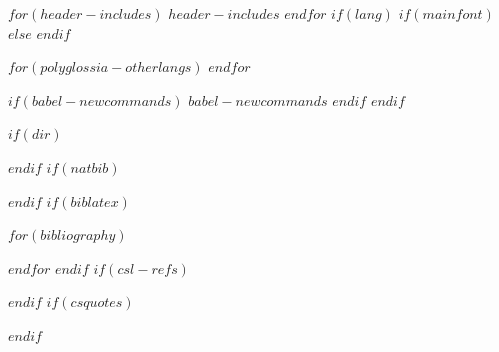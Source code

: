 $for(header-includes)$
$header-includes$
$endfor$
$if(lang)$
\ifxetex
  $if(mainfont)$
  $else$
  \renewcommand*\familydefault{\sfdefault}
  $endif$
  \usepackage{polyglossia}
  \setmainlanguage[$for(polyglossia-lang.options)$$polyglossia-lang.options$$sep$,$endfor$]{$polyglossia-lang.name$}
$for(polyglossia-otherlangs)$
$endfor$
\else
  \usepackage[$for(babel-otherlangs)$$babel-otherlangs$,$endfor$main=$babel-lang$]{babel}
\let\LanguageShortHands\languageshorthands
\def\languageshorthands#1{}
$if(babel-newcommands)$
  $babel-newcommands$
$endif$
\fi
$endif$
\ifluatex
  \usepackage{selnolig}  %
\fi
$if(dir)$
\ifxetex
  \usepackage{bidi}
\fi
{}\fi{} %
  \newcommand{\RL}[1]{\beginR #1\endR}
  \newcommand{\LR}[1]{\beginL #1\endL}
  \newenvironment{RTL}{\beginR}{\endR}
  \newenvironment{LTR}{\beginL}{\endL}
\fi
$endif$
$if(natbib)$
\usepackage[$natbiboptions$]{natbib}

$endif$
$if(biblatex)$
\usepackage[$if(biblio-style)$style=$biblio-style$,$endif$$for(biblatexoptions)$$biblatexoptions$$sep$,$endfor$]{biblatex}
$for(bibliography)$

$endfor$
$endif$
$if(csl-refs)$
\newlength{\cslhangindent}
\setlength{\cslhangindent}{1.5em}
\newlength{\csllabelwidth}
\setlength{\csllabelwidth}{3em}
\newenvironment{CSLReferences}[2] %
 {%
  \setlength{\parindent}{0pt}
  \ifodd #1 \everypar{\setlength{\hangindent}{\cslhangindent}}\ignorespaces\fi
  \ifnum #2 > 0
  \setlength{\parskip}{#2\baselineskip}
  \fi
 }%
 {}
\usepackage{calc}
\newcommand{\CSLBlock}[1]{#1\hfill\break}
\newcommand{\CSLLeftMargin}[1]{\parbox[t]{\csllabelwidth}{#1}}
\newcommand{\CSLRightInline}[1]{\parbox[t]{\linewidth - \csllabelwidth}{#1}\break}
\newcommand{\CSLIndent}[1]{\hspace{\cslhangindent}#1}
$endif$
$if(csquotes)$
\usepackage{csquotes}
$endif$

